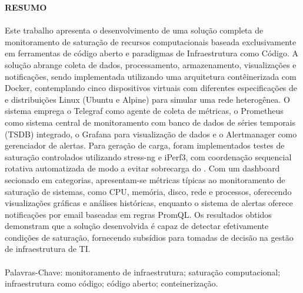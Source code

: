 \begin{center}
\textbf{RESUMO}
\end{center}
\vspace{0.5cm}

\paragraph{}
{\color{red}
Este trabalho apresenta o desenvolvimento de uma solução completa de monitoramento de saturação de recursos computacionais baseada exclusivamente em ferramentas de código aberto e paradigmas de Infraestrutura como Código. A solução abrange coleta de dados, processamento, armazenamento, visualizações e notificações, sendo implementada utilizando uma arquitetura contêinerizada com Docker, contemplando cinco dispositivos virtuais com diferentes especificações de  e distribuições Linux (Ubuntu e Alpine) para simular uma rede heterogênea. O sistema emprega o Telegraf como agente de coleta de métricas, o Prometheus como sistema central de monitoramento com banco de dados de séries temporais (TSDB) integrado, o Grafana para visualização de dados e o Alertmanager como gerenciador de alertas. Para geração de carga, foram implementados testes de saturação controlados utilizando stress-ng e iPerf3, com coordenação sequencial rotativa automatizada de modo a evitar sobrecarga do . Com um dashboard secionado em categorias, apresentam-se métricas típicas ao monitoramento de saturação de sistemas, como CPU, memória, disco, rede e processos, oferecendo visualizações gráficas e análises históricas, enquanto o sistema de alertas oferece notificações por email baseadas em regras PromQL. Os resultados obtidos demonstram que a solução desenvolvida é capaz de detectar efetivamente condições de saturação, fornecendo subsídios para tomadas de decisão na gestão de infraestrutura de TI.

\paragraph{}
\noindent Palavras-Chave: monitoramento de infraestrutura; saturação computacional; infraestrutura como código; código aberto; conteinerização.
}
\pagebreak
